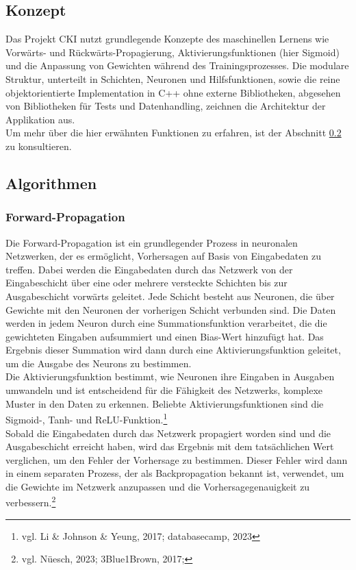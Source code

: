 \subsection{Konzept}
Das Projekt CKI nutzt grundlegende Konzepte des maschinellen Lernens wie Vorwärts- und Rückwärts-Propagierung, Aktivierungsfunktionen (hier Sigmoid) und die Anpassung von Gewichten während des Trainingsprozesses. Die modulare Struktur, unterteilt in Schichten, Neuronen und Hilfsfunktionen, sowie die reine objektorientierte Implementation in C++ ohne externe Bibliotheken, abgesehen von Bibliotheken für Tests und Datenhandling, zeichnen die Architektur der Applikation aus.
\\
Um mehr über die hier erwähnten Funktionen zu erfahren, ist der Abschnitt \ref{sec:RealAlgorithmen} zu konsultieren.

\subsection{Algorithmen}
\label{sec:RealAlgorithmen}
\subsubsection{ Forward-Propagation}
\label{sec:RealForwardPropagation}
Die Forward-Propagation ist ein grundlegender Prozess in neuronalen Netzwerken, der es ermöglicht, Vorhersagen auf Basis von Eingabedaten zu treffen. Dabei werden die Eingabedaten durch das Netzwerk von der Eingabeschicht über eine oder mehrere versteckte Schichten bis zur Ausgabeschicht vorwärts geleitet. Jede Schicht besteht aus Neuronen, die über Gewichte mit den Neuronen der vorherigen Schicht verbunden sind. Die Daten werden in jedem Neuron durch eine Summationsfunktion verarbeitet, die die gewichteten Eingaben aufsummiert und einen Bias-Wert hinzufügt hat. Das Ergebnis dieser Summation wird dann durch eine Aktivierungsfunktion geleitet, um die Ausgabe des Neurons zu bestimmen.
\\
Die Aktivierungsfunktion bestimmt, wie Neuronen ihre Eingaben in Ausgaben umwandeln und ist entscheidend für die Fähigkeit des Netzwerks, komplexe Muster in den Daten zu erkennen. Beliebte Aktivierungsfunktionen sind die Sigmoid-, Tanh- und ReLU-Funktion.\footnote{vgl. Li \& Johnson \& Yeung, 2017; databasecamp, 2023}
\\
Sobald die Eingabedaten durch das Netzwerk propagiert worden sind und die Ausgabeschicht erreicht haben, wird das Ergebnis mit dem tatsächlichen Wert verglichen, um den Fehler der Vorhersage zu bestimmen. Dieser Fehler wird dann in einem separaten Prozess, der als Backpropagation bekannt ist, verwendet, um die Gewichte im Netzwerk anzupassen und die Vorhersagegenauigkeit zu verbessern.\footnote{vgl. Nüesch, 2023;  3Blue1Brown, 2017;}

